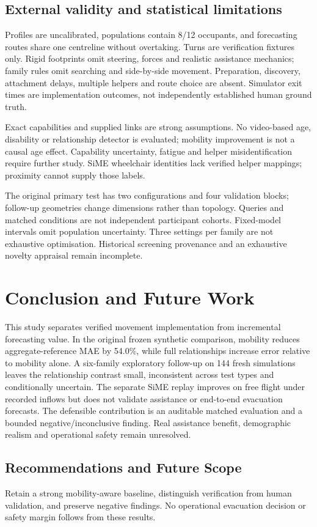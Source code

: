 \subsection{External validity and statistical limitations}
Profiles are uncalibrated, populations contain 8/12 occupants, and forecasting routes share one centreline without overtaking. Turns are verification fixtures only. Rigid footprints omit steering, forces and realistic assistance mechanics; family rules omit searching and side-by-side movement. Preparation, discovery, attachment delays, multiple helpers and route choice are absent. Simulator exit times are implementation outcomes, not independently established human ground truth.

Exact capabilities and supplied links are strong assumptions. No video-based age, disability or relationship detector is evaluated; mobility improvement is not a causal age effect. Capability uncertainty, fatigue and helper misidentification require further study. SiME wheelchair identities lack verified helper mappings; proximity cannot supply those labels.

The original primary test has two configurations and four validation blocks; follow-up geometries change dimensions rather than topology. Queries and matched conditions are not independent participant cohorts. Fixed-model intervals omit population uncertainty. Three settings per family are not exhaustive optimisation. Historical screening provenance and an exhaustive novelty appraisal remain incomplete.

\section{Conclusion and Future Work}
This study separates verified movement implementation from incremental forecasting value. In the original frozen synthetic comparison, mobility reduces aggregate-reference MAE by 54.0\%, while full relationships increase error relative to mobility alone. A six-family exploratory follow-up on 144 fresh simulations leaves the relationship contrast small, inconsistent across test types and conditionally uncertain. The separate SiME replay improves on free flight under recorded inflows but does not validate assistance or end-to-end evacuation forecasts. The defensible contribution is an auditable matched evaluation and a bounded negative/inconclusive finding. Real assistance benefit, demographic realism and operational safety remain unresolved.

\subsection{Recommendations and Future Scope}
Retain a strong mobility-aware baseline, distinguish verification from human validation, and preserve negative findings. No operational evacuation decision or safety margin follows from these results.


